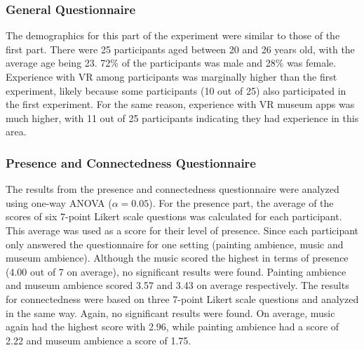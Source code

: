 \documentclass[a4paper]{article}
\begin{document}
\subsubsection{General Questionnaire}
The demographics for this part of the experiment were similar to those of the first part. There were 25 participants aged between 20 and 26 years old, with the average age being 23. 72\% of the participants was male and 28\% was female. Experience with VR among participants was marginally higher than the first experiment, likely because some participants (10 out of 25) also participated in the first experiment. For the same reason, experience with VR museum apps was much higher, with 11 out of 25 participants indicating they had experience in this area.

\subsubsection{Presence and Connectedness Questionnaire}
The results from the presence and connectedness questionnaire were analyzed using one-way ANOVA ($\alpha=0.05$). For the presence part, the average of the scores of six 7-point Likert scale questions was calculated for each participant. This average was used as a score for their level of presence. Since each participant only answered the questionnaire for one setting (painting ambience, music and museum ambience). Although the music scored the highest in terms of presence (4.00 out of 7 on average), no significant results were found. Painting ambience and museum ambience scored 3.57 and 3.43 on average respectively. The results for connectedness were based on three 7-point Likert scale questions and analyzed in the same way. Again, no significant results were found. On average, music again had the highest score with 2.96, while painting ambience had a score of 2.22 and museum ambience a score of 1.75.
\end{document}
